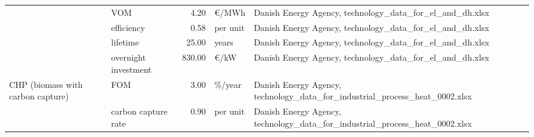 \begin{longtable}{p{4cm}p{4cm}rp{3cm}p{10cm}}
                      & VOM &         4.20 &                     \euro/MWh &                                                                                                                                                                                                                                                                        Danish Energy Agency, technology\_data\_for\_el\_and\_dh.xlsx \\
                      & efficiency &         0.58 &                      per unit &                                                                                                                                                                                                                                                                        Danish Energy Agency, technology\_data\_for\_el\_and\_dh.xlsx \\
                      & lifetime &        25.00 &                         years &                                                                                                                                                                                                                                                                        Danish Energy Agency, technology\_data\_for\_el\_and\_dh.xlsx \\
                      & overnight investment &       830.00 &                      \euro/kW &                                                                                                                                                                                                                                                                        Danish Energy Agency, technology\_data\_for\_el\_and\_dh.xlsx \\
CHP (biomass with carbon capture) & FOM &         3.00 &                       \%/year &                                                                                                                                                                                                                                                    Danish Energy Agency, technology\_data\_for\_industrial\_process\_heat\_0002.xlsx \\
                      & carbon capture rate &         0.90 &                      per unit &                                                                                                                                                                                                                                                    Danish Energy Agency, technology\_data\_for\_industrial\_process\_heat\_0002.xlsx \\

\end{longtable}
